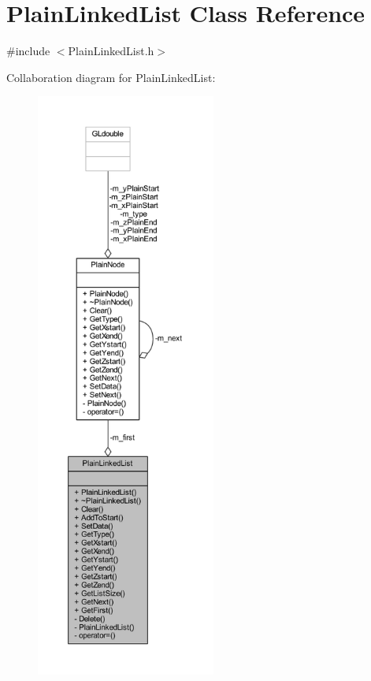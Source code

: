 \hypertarget{class_plain_linked_list}{}\section{Plain\+Linked\+List Class Reference}
\label{class_plain_linked_list}


{\ttfamily \#include $<$Plain\+Linked\+List.\+h$>$}



Collaboration diagram for Plain\+Linked\+List\+:
\nopagebreak
\begin{figure}[H]
\begin{center}
\leavevmode
\includegraphics[height=550pt]{class_plain_linked_list__coll__graph}
\end{center}
\end{figure}

